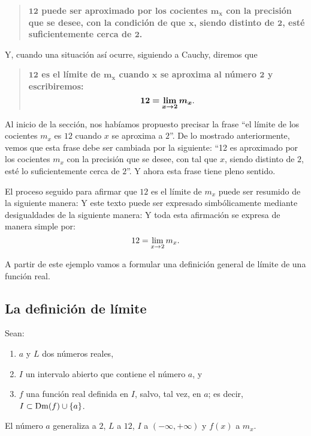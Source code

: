 \begin{quote}
{\bfseries $\bm{12}$ puede ser aproximado por los cocientes $\bm{m_x}$ con la precisión que se
desee, con la condición de que $\bm{x}$, siendo distinto de $\bm{2}$, esté suficientemente cerca de
$\bm{2}$.}
\end{quote}
Y, cuando una situación así ocurre, siguiendo a Cauchy, diremos que
\begin{quote}
{\bfseries $\bm{12}$ es el límite de $\bm{m_x}$ cuando $\bm{x}$ se aproxima al número $\bm{2}$ y
escribiremos:
\[
\bm{12 =} \bm{\limjc{m_x}{x}{2}}.
\]
}
\end{quote}

Al inicio de la sección, nos habíamos propuesto precisar la frase ``el límite de los cocientes
$m_x$ es $12$ cuando $x$ se aproxima a $2$''. De lo mostrado anteriormente, vemos que esta frase
debe ser cambiada por la siguiente: ``12 es aproximado por los cocientes $m_x$ con la precisión que
se desee, con tal que $x$, siendo distinto de $2$, esté lo suficientemente cerca de $2$''. Y ahora
esta frase tiene pleno sentido.

El proceso seguido para afirmar que $12$ es el límite de $m_x$ puede ser resumido de la siguiente
manera:
 Y este texto puede ser expresado simbólicamente mediante desigualdades de la
siguiente manera:
 Y toda esta afirmación se expresa de manera simple por:
\[
12 = \limjc{m_x}{x}{2}.
\]

A partir de este ejemplo vamos a formular una definición general de límite de una función real.

\subsection{La definición de límite}
Sean:
\begin{enumerate}
\item $a$ y $L$ dos números reales,
\item $I$ un intervalo abierto que contiene el número $a$, y
\item $f$ una función real definida en $I$, salvo, tal vez, en $a$; es decir, $I \subset \Dm(f)
    \cup \{a\}$.
\end{enumerate}
El número $a$ generaliza a $2$, $L$ a $12$, $I$ a $(-\infty,+\infty)$ y $f(x)$ a $m_x$.

